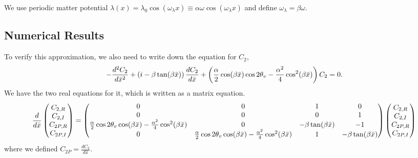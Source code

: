 \documentclass[letterpaper,12pt,english]{sphinxmanual}
\begin{document}
We use periodic matter potential \(\lambda(x) = \lambda_0 \cos(\omega_\lambda x) \equiv \alpha\omega \cos(\omega_\lambda x)\) and define \(\omega_\lambda = \beta \omega\).


\subsection{Numerical Results}
\label{matter-driven:numerical-results}
To verify this approximation, we also need to write down the equation for \(C_2\),
\begin{gather}
\begin{split}- \frac{d^2 C_2}{d\bar x ^2} + \left( i -\beta \tan (\beta \bar x) \right) \frac{d C_2}{d\bar x} + \left( \frac{\alpha}{2} \cos (\beta \bar x)\cos 2\theta_v - \frac{\alpha^2}{4} \cos^2 (\beta \bar x)  \right) C_2 = 0 .\end{split}\notag
\end{gather}
We have the two real equations for it, which is written as a matrix equation.
\begin{gather}
\begin{split}\frac{d}{d\bar x}\begin{pmatrix} C_{2,R} \\ C_{2,I} \\ C_{2P,R} \\ C_{2P,I} \end{pmatrix} =\begin{pmatrix}
0 & 0 & 1 & 0 \\
0  & 0 & 0 & 1 \\
\frac{\alpha}{2}\cos 2\theta_v \cos (\beta \bar x) - \frac{\alpha^2}{4}\cos^2 (\beta \bar x) & 0 & -\beta \tan (\beta\bar x) & -1 \\
0 & \frac{\alpha}{2}\cos 2\theta_v \cos (\beta \bar x) - \frac{\alpha^2}{4}\cos^2 (\beta \bar x) & 1 & -\beta \tan (\beta \bar x)
\end{pmatrix} \begin{pmatrix} C_{2,R} \\ C_{2,I} \\ C_{2P,R} \\ C_{2P,I} \end{pmatrix}\end{split}\notag
\end{gather}
where we defined \(C_{2P}=\frac{dC_{2}}{d\bar x}\).
\end{document}
